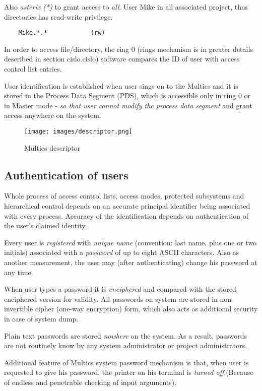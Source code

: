 Also \textit{asterix (*)} to grant access to \textit{all}.
User Mike in all associated project, thus directories has read-write privilege.
\begin{lstlisting}
    Mike.*.*            (rw)
\end{lstlisting}
In order to access file/directory, the ring 0 (rings mechanism is in greater details described in section cislo.cislo) 
software compares the ID of user with access control list entries.

User identification is established when user sings on to the Multics and it is stored in the Process Data 
Segment (PDS), which is accessible only in ring 0 or in Master mode - \textit{so that user cannot modify the
process data segment} and grant access anywhere on the system.

\begin{figure}
    \texttt{[image: images/descriptor.png]}
    \caption{Multics descriptor \cite{protectionSaltzer}}
    \label{fig:descriptor}
\end{figure}

\subsection{Authentication of users}

Whole process of access control lists, access modes, protected subsystems and hierarchical control depends on an 
accurate principal identifier being associated with every process. Accuracy of the identification depends on 
authentication of the user's claimed identity.

Every user is \textit{registered} with \textit{unique name} (convention: last name, plus one or two initials) 
associated with a \textit{password} of up to eight ASCII characters. Also as another measurement, the user may 
(after authenticating) change his password at any time.

When user types a password it is \textit{enciphered} and compared with the stored enciphered version for validity.
All passwords on system are stored in non-invertible cipher (one-way encryption) form, which also acts as additional 
security in case of system dump. 

Plain text passwords are stored \textit{nowhere} on the system. As a result, passwords 
are not routinely know by any system administrator or project administrators.

Additional feature of Multics system password mechanism is that, when user is requested to give his password, the printer 
on his terminal is \textit{turned off}.(Because of endless and penetrable checking of input arguments).


